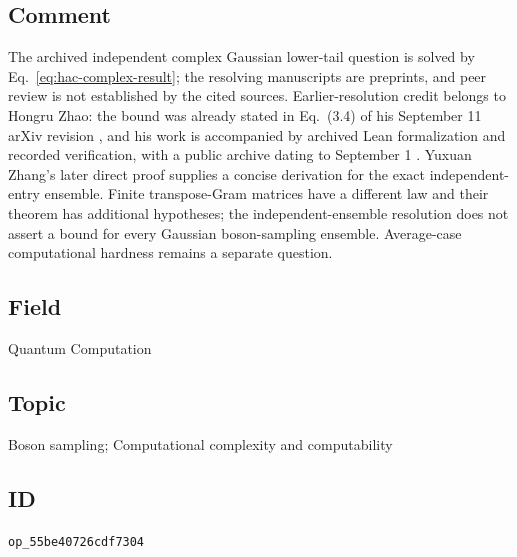 \subsection*{Comment}

The archived independent complex Gaussian lower-tail question is solved by Eq.~\eqref{eq:hac-complex-result}; the resolving manuscripts are preprints, and peer review is not established by the cited sources.
Earlier-resolution credit belongs to Hongru Zhao: the bound was already stated in Eq.~(3.4) of his September 11 arXiv revision , and his work is accompanied by archived Lean formalization and recorded verification, with a public archive dating to September 1 .
Yuxuan Zhang's later direct proof supplies a concise derivation for the exact independent-entry ensemble.
Finite transpose-Gram matrices have a different law and their theorem has additional hypotheses; the independent-ensemble resolution does not assert a bound for every Gaussian boson-sampling ensemble.
Average-case computational hardness remains a separate question.

\subsection*{Field}

Quantum Computation

\subsection*{Topic}

Boson sampling; Computational complexity and computability

\subsection*{ID}

\texttt{op\_55be40726cdf7304}

